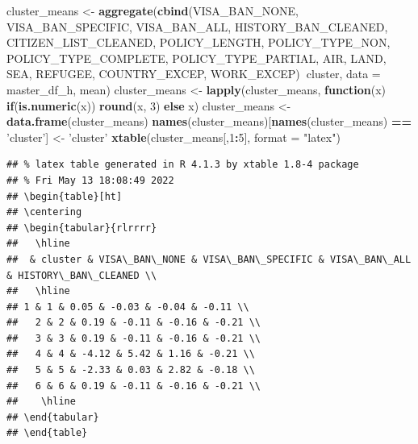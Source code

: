 \documentclass[]{article}
\newenvironment{Shaded}{\begin{snugshade}}{\end{snugshade}}
\newcommand{\ControlFlowTok}[1]{\textcolor[rgb]{0.13,0.29,0.53}{\textbf{#1}}}
\newcommand{\DataTypeTok}[1]{\textcolor[rgb]{0.13,0.29,0.53}{#1}}
\newcommand{\DecValTok}[1]{\textcolor[rgb]{0.00,0.00,0.81}{#1}}
\newcommand{\KeywordTok}[1]{\textcolor[rgb]{0.13,0.29,0.53}{\textbf{#1}}}
\newcommand{\NormalTok}[1]{#1}
\newcommand{\OperatorTok}[1]{\textcolor[rgb]{0.81,0.36,0.00}{\textbf{#1}}}
\newcommand{\StringTok}[1]{\textcolor[rgb]{0.31,0.60,0.02}{#1}}
\begin{document}
\begin{Shaded}
\begin{Highlighting}[]
\NormalTok{cluster_means <-}\StringTok{ }\KeywordTok{aggregate}\NormalTok{(}\KeywordTok{cbind}\NormalTok{(VISA_BAN_NONE, VISA_BAN_SPECIFIC, VISA_BAN_ALL,}
\NormalTok{                HISTORY_BAN_CLEANED,}
\NormalTok{                CITIZEN_LIST_CLEANED, POLICY_LENGTH, POLICY_TYPE_NON, }
\NormalTok{                POLICY_TYPE_COMPLETE, POLICY_TYPE_PARTIAL,}
\NormalTok{                AIR, LAND, }
\NormalTok{                SEA, REFUGEE, COUNTRY_EXCEP, WORK_EXCEP)}\OperatorTok{~}\NormalTok{cluster, }\DataTypeTok{data =}\NormalTok{ master_df_h, mean)}
\NormalTok{cluster_means <-}\StringTok{ }\KeywordTok{lapply}\NormalTok{(cluster_means, }\ControlFlowTok{function}\NormalTok{(x) }\ControlFlowTok{if}\NormalTok{(}\KeywordTok{is.numeric}\NormalTok{(x)) }\KeywordTok{round}\NormalTok{(x, }\DecValTok{3}\NormalTok{) }\ControlFlowTok{else}\NormalTok{ x)}
\NormalTok{cluster_means <-}\StringTok{ }\KeywordTok{data.frame}\NormalTok{(cluster_means)}
\KeywordTok{names}\NormalTok{(cluster_means)[}\KeywordTok{names}\NormalTok{(cluster_means) }\OperatorTok{==}\StringTok{ 'cluster'}\NormalTok{] <-}\StringTok{ 'cluster'}
\KeywordTok{xtable}\NormalTok{(cluster_means[,}\DecValTok{1}\OperatorTok{:}\DecValTok{5}\NormalTok{], }\DataTypeTok{format =} \StringTok{"latex"}\NormalTok{)}
\end{Highlighting}
\end{Shaded}

\begin{verbatim}
## % latex table generated in R 4.1.3 by xtable 1.8-4 package
## % Fri May 13 18:08:49 2022
## \begin{table}[ht]
## \centering
## \begin{tabular}{rlrrrr}
##   \hline
##  & cluster & VISA\_BAN\_NONE & VISA\_BAN\_SPECIFIC & VISA\_BAN\_ALL & HISTORY\_BAN\_CLEANED \\ 
##   \hline
## 1 & 1 & 0.05 & -0.03 & -0.04 & -0.11 \\ 
##   2 & 2 & 0.19 & -0.11 & -0.16 & -0.21 \\ 
##   3 & 3 & 0.19 & -0.11 & -0.16 & -0.21 \\ 
##   4 & 4 & -4.12 & 5.42 & 1.16 & -0.21 \\ 
##   5 & 5 & -2.33 & 0.03 & 2.82 & -0.18 \\ 
##   6 & 6 & 0.19 & -0.11 & -0.16 & -0.21 \\ 
##    \hline
## \end{tabular}
## \end{table}
\end{verbatim}
\end{document}
